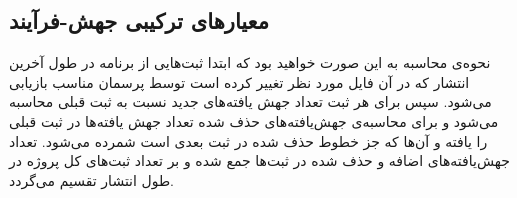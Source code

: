 \subsection{معیارهای ترکیبی جهش-فرآیند}

نحوه‌ی محاسبه به این صورت خواهید بود که ابتدا ثبت‌هایی از برنامه در طول آخرین انتشار که در آن فایل مورد نظر تغییر کرده است  توسط  پرسمان   مناسب بازیابی می‌شود. سپس برای هر ثبت تعداد جهش یافته‌های جدید نسبت به ثبت قبلی محاسبه می‌شود و برای محاسبه‌ی جهش‌یافته‌های حذف شده تعداد جهش یافته‌ها در  ثبت قبلی را یافته و آن‌ها که جز خطوط حذف شده در ثبت بعدی است شمرده می‌شود. تعداد جهش‌یافته‌های اضافه و حذف شده در ثبت‌ها جمع شده و بر تعداد ثبت‌های کل پروژه در طول انتشار تقسیم می‌گردد.

\begin{comment}

\begin{latin}
\begin{lstlisting}[language=SQL]
SELECT CC.* from CommitChangedFile CC, CommitInfo CI where CC.COMMIT_INFO_ID = CI.ID
AND CI.SEQUENCE_NUMBER BETWEEN :startSeq AND :endSeq
AND CI.PROJECT = :project
AND CC.FILE_NAME = :fileName ORDER BY CI.SEQUENCE_NUMBER asc
\end{lstlisting}
\end{latin}
\captionof{lstlisting}{بازیابی اطلاعات ثبت‌هایی که یک فایل در بازه‌ی مشخص در آنها تغییر کرده است}
\label{code:commit-during-release}
\end{comment}